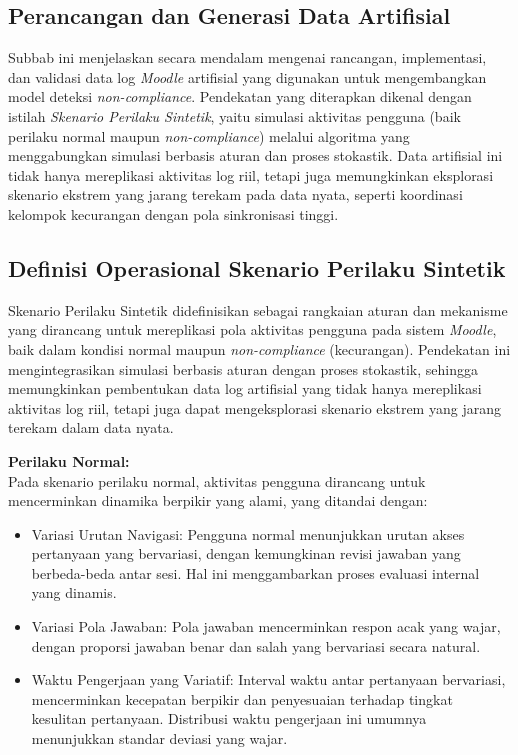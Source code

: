 \subsection{Perancangan dan Generasi Data Artifisial}
\label{sec:perancanganGenerasiDataArtifisial}
Subbab ini menjelaskan secara mendalam mengenai rancangan, implementasi, dan validasi data log \textit{Moodle} artifisial yang digunakan untuk mengembangkan model deteksi \textit{non-compliance}. Pendekatan yang diterapkan dikenal dengan istilah \textit{Skenario Perilaku Sintetik}, yaitu simulasi aktivitas pengguna (baik perilaku normal maupun \textit{non-compliance}) melalui algoritma yang menggabungkan simulasi berbasis aturan dan proses stokastik. Data artifisial ini tidak hanya mereplikasi aktivitas log riil, tetapi juga memungkinkan eksplorasi skenario ekstrem yang jarang terekam pada data nyata, seperti koordinasi kelompok kecurangan dengan pola sinkronisasi tinggi.

\subsection{Definisi Operasional Skenario Perilaku Sintetik}
\label{sec:definisiOperasionalSkenarioPerilakuSintetik}
Skenario Perilaku Sintetik didefinisikan sebagai rangkaian aturan dan mekanisme yang dirancang untuk mereplikasi pola aktivitas pengguna pada sistem \textit{Moodle}, baik dalam kondisi normal maupun \textit{non-compliance} (kecurangan). Pendekatan ini mengintegrasikan simulasi berbasis aturan dengan proses stokastik, sehingga memungkinkan pembentukan data log artifisial yang tidak hanya mereplikasi aktivitas log riil, tetapi juga dapat mengeksplorasi skenario ekstrem yang jarang terekam dalam data nyata.

\textbf{Perilaku Normal:} \\
Pada skenario perilaku normal, aktivitas pengguna dirancang untuk mencerminkan dinamika berpikir yang alami, yang ditandai dengan:
\begin{itemize}
    \item Variasi Urutan Navigasi: Pengguna normal menunjukkan urutan akses pertanyaan yang bervariasi, dengan kemungkinan revisi jawaban yang berbeda-beda antar sesi. Hal ini menggambarkan proses evaluasi internal yang dinamis.
    \item Variasi Pola Jawaban: Pola jawaban mencerminkan respon acak yang wajar, dengan proporsi jawaban benar dan salah yang bervariasi secara natural.
    \item Waktu Pengerjaan yang Variatif: Interval waktu antar pertanyaan bervariasi, mencerminkan kecepatan berpikir dan penyesuaian terhadap tingkat kesulitan pertanyaan. Distribusi waktu pengerjaan ini umumnya menunjukkan standar deviasi yang wajar.
\end{itemize}

